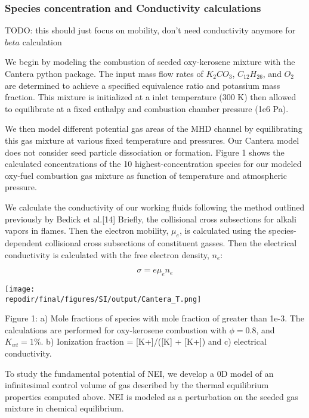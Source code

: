 \hypertarget{species-concentration-and-conductivity-calculations}{%
\subsubsection{Species concentration and Conductivity calculations}\label{species-concentration-and-conductivity-calculations}}

TODO: this should just focus on mobility, don't need conductivity anymore for $beta$ calculation

We begin by modeling the combustion of seeded oxy-kerosene mixture with the Cantera python package. The input mass flow rates of $K_2CO_3$, $C_{12}H_{26}$, and $O_2$ are determined to achieve a specified equivalence ratio and potassium mass fraction. This mixture is initialized at a inlet temperature (300 K) then allowed to equilibrate at a fixed enthalpy and combustion chamber pressure (1e6 Pa).

We then model different potential gas areas of the MHD channel by equilibrating this gas mixture at various fixed temperature and pressures. Our Cantera model does not consider seed particle dissociation or formation. Figure 1 shows the calculated concentrations of the 10 highest-concentration species for our modeled oxy-fuel combustion gas mixture as function of temperature and atmospheric pressure.

We calculate the conductivity of our working fluids following the method outlined previously by Bedick et al.{[}14{]} Briefly, the collisional cross subsections for alkali vapors in flames. Then the electron mobility, \(\mu_{e}\), is calculated using the species-dependent collisional cross subsections of constituent gasses. Then the electrical conductivity is calculated with the free electron density, \(n_{e}\):

\begin{equation}
\sigma = e\mu_{e}n_{e}
\end{equation}

\texttt{[image: \\repodir/final/figures/SI/output/Cantera\_T.png]}

Figure 1: a) Mole fractions of species with mole fraction of greater than 1e-3. The calculations are performed for oxy-kerosene combustion with \(\phi = 0.8\), and \(K_{wt} = 1\%\). b) Ionization fraction = {[}K+{]}/({[}K{]} + {[}K+{]}) and c) electrical conductivity.

To study the fundamental potential of NEI, we develop a 0D model of an infinitesimal control volume of gas described by the thermal equilibrium properties computed above. NEI is modeled as a perturbation on the seeded gas mixture in chemical equilibrium. 


